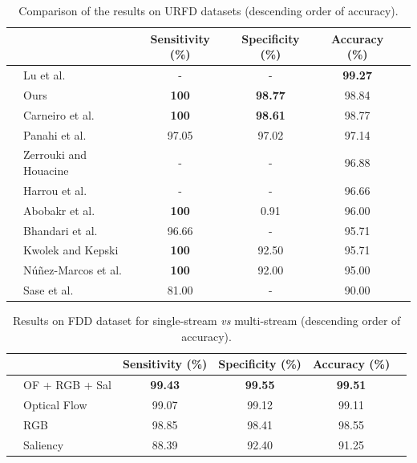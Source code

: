 \documentclass[10pt, conference, compsocconf]{IEEEtran}
\begin{document}
\begin{table}[!htb]
\centering
\caption{Comparison of the results on URFD datasets (descending order of accuracy).}
\label{tab:urfd-our-their}
\begin{tabular}{llcccl}
\hline
 &                                                      & Sensitivity (\%)  & Specificity (\%)  & Accuracy (\%)     & \\ \hline
 & Lu et al.~\cite{lu2018deep}                          & -                 & -                 & \textbf{99.27}    & \\
 & Ours                                                 & \textbf{100}      & \textbf{98.77}    & 98.84             & \\
 & Carneiro et al.~\cite{carneiro2019multi}                                                 & \textbf{100}      & \textbf{98.61}    & 98.77             & \\
 & Panahi et al.~\cite{panahi2018human}                 & 97.05             & 97.02             & 97.14             & \\
 & Zerrouki and Houacine~\cite{zerrouki2018combined}    & -                 & -                 & 96.88             & \\
 & Harrou et al.~\cite{harrou2017vision}                & -                 & -                 & 96.66             & \\
 & Abobakr et al.~\cite{abobakr2017skeleton}            & \textbf{100}      & 0.91              & 96.00             & \\
 & Bhandari et al.~\cite{bhandari2017novel}             & 96.66             & -                 & 95.71             & \\
 & Kwolek and Kepski~\cite{kwolek2015improving}         & \textbf{100}      & 92.50             & 95.71             & \\
 & N\'u\~nez-Marcos et al.~\cite{nunez2017vision}       & \textbf{100}      & 92.00             & 95.00             & \\
 & Sase et al.~\cite{sase2018human}                     & 81.00             & -                 & 90.00             & \\ \hline
\end{tabular}
\end{table}

\begin{table}[!htb]
\centering
\caption{Results on FDD dataset for single-stream \textit{vs} multi-stream (descending order of accuracy).}
\label{tab:fdd-ensem}
\begin{tabular}{llcccl}
\hline
 &  & Sensitivity (\%) & Specificity (\%) & Accuracy (\%) &  \\ \hline
 & OF + RGB + Sal & \textbf{99.43} & \textbf{99.55} & \textbf{99.51} &  \\
 & Optical Flow & 99.07             & 99.12             & 99.11             &  \\
 & RGB & 98.85             & 98.41             & 98.55             &  \\
 & Saliency & 88.39             & 92.40             & 91.25             & \\ \hline
\end{tabular}
\end{table}
\end{document}
